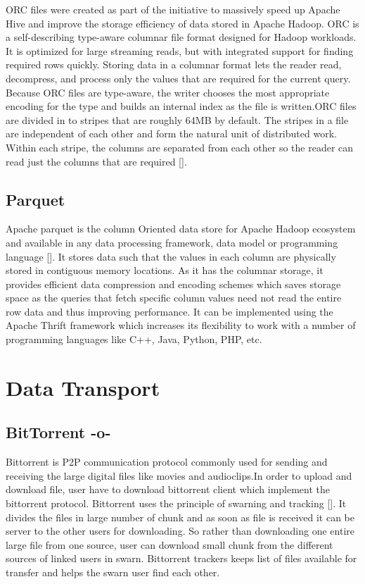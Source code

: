 ORC files were created as part of the initiative to massively speed up
Apache Hive and improve the storage efficiency of data stored in
Apache Hadoop. ORC is a self-describing type-aware columnar file
format designed for Hadoop workloads. It is optimized for large
streaming reads, but with integrated support for finding required rows
quickly. Storing data in a columnar format lets the reader read,
decompress, and process only the values that are required for the
current query. Because ORC files are type-aware, the writer chooses
the most appropriate encoding for the type and builds an internal
index as the file is written.ORC files are divided in to stripes that
are roughly 64MB by default. The stripes in a file are independent of
each other and form the natural unit of distributed work. Within each
stripe, the columns are separated from each other so the reader can
read just the columns that are required [\cite{www-orc-docs}].

     
\subsection{Parquet}

Apache parquet is the column Oriented data store for Apache Hadoop
ecosystem and available in any data processing framework, data model
or programming language [\cite{www-parquet}]. It stores data such that
the values in each column are physically stored in contiguous memory
locations. As it has the columnar storage, it provides efficient data
compression and encoding schemes which saves storage space as the
queries that fetch specific column values need not read the entire row
data and thus improving performance. It can be implemented using the
Apache Thrift framework which increases its flexibility to work with a
number of programming languages like C++, Java, Python, PHP, etc.
     
\section{Data Transport}

\subsection{BitTorrent -o-}

Bittorrent is P2P communication protocol commonly used for sending and
receiving the large digital files like movies and audioclips.In order
to upload and download file, user have to download bittorrent client
which implement the bittorrent protocol. Bittorrent uses the principle
of swarning and tracking [\cite{www-bittorrent}]. It divides the files
in large number of chunk and as soon as file is received it can be
server to the other users for downloading.  So rather than downloading
one entire large file from one source, user can download small chunk
from the different sources of linked users in swarn. Bittorrent
trackers keeps list of files available for transfer and helps the
swarn user find each other.

